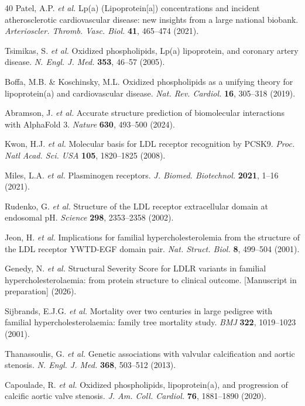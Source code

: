 \documentclass[11pt,a4paper]{article}
\begin{document}
\begin{thebibliography}{40}
 Patel, A.P. \textit{et al.} Lp(a) (Lipoprotein[a]) concentrations and incident atherosclerotic cardiovascular disease: new insights from a large national biobank. \textit{Arterioscler. Thromb. Vasc. Biol.} \textbf{41}, 465--474 (2021).

 Tsimikas, S. \textit{et al.} Oxidized phospholipids, Lp(a) lipoprotein, and coronary artery disease. \textit{N. Engl. J. Med.} \textbf{353}, 46--57 (2005).

 Boffa, M.B. \& Koschinsky, M.L. Oxidized phospholipids as a unifying theory for lipoprotein(a) and cardiovascular disease. \textit{Nat. Rev. Cardiol.} \textbf{16}, 305--318 (2019).

 Abramson, J. \textit{et al.} Accurate structure prediction of biomolecular interactions with AlphaFold 3. \textit{Nature} \textbf{630}, 493--500 (2024).

 Kwon, H.J. \textit{et al.} Molecular basis for LDL receptor recognition by PCSK9. \textit{Proc. Natl Acad. Sci. USA} \textbf{105}, 1820--1825 (2008).

 Miles, L.A. \textit{et al.} Plasminogen receptors. \textit{J. Biomed. Biotechnol.} \textbf{2021}, 1--16 (2021).

 Rudenko, G. \textit{et al.} Structure of the LDL receptor extracellular domain at endosomal pH. \textit{Science} \textbf{298}, 2353--2358 (2002).

 Jeon, H. \textit{et al.} Implications for familial hypercholesterolemia from the structure of the LDL receptor YWTD-EGF domain pair. \textit{Nat. Struct. Biol.} \textbf{8}, 499--504 (2001).

 Genedy, N. \textit{et al.} Structural Severity Score for LDLR variants in familial hypercholesterolaemia: from protein structure to clinical outcome. [Manuscript in preparation] (2026).

 Sijbrands, E.J.G. \textit{et al.} Mortality over two centuries in large pedigree with familial hypercholesterolaemia: family tree mortality study. \textit{BMJ} \textbf{322}, 1019--1023 (2001).

 Thanassoulis, G. \textit{et al.} Genetic associations with valvular calcification and aortic stenosis. \textit{N. Engl. J. Med.} \textbf{368}, 503--512 (2013).

 Capoulade, R. \textit{et al.} Oxidized phospholipids, lipoprotein(a), and progression of calcific aortic valve stenosis. \textit{J. Am. Coll. Cardiol.} \textbf{76}, 1881--1890 (2020).


\end{thebibliography}
\end{document}
